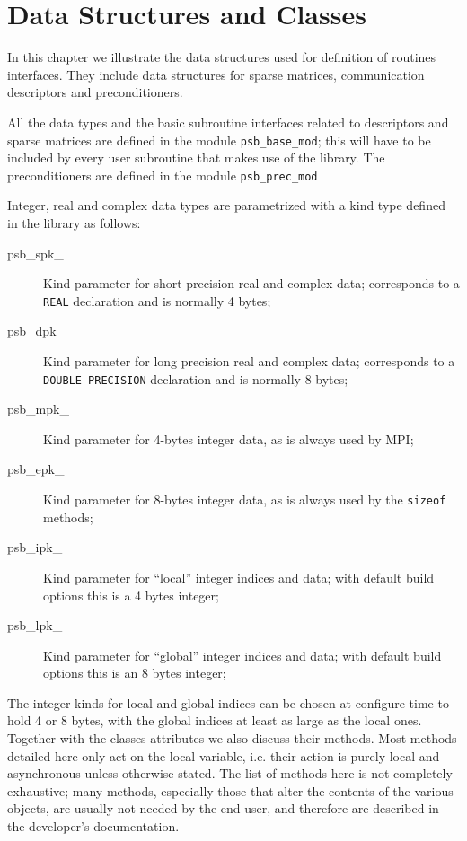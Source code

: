 \section{Data Structures and Classes}
\label{sec:datastruct}

In this chapter we  illustrate the  data structures used for definition of
routines interfaces. They  include data structures for sparse matrices,
communication descriptors and preconditioners.%

All the data types and the basic subroutine interfaces related to
descriptors and sparse matrices are defined in
the module \verb|psb_base_mod|; this will have to be included by every
user subroutine that makes use of the library. The preconditioners are
defined in the module \verb|psb_prec_mod|

Integer, real and complex data types are parametrized with a kind type
defined in the library as follows: 
\begin{description}
\item[psb\_spk\_] Kind parameter for short precision real and complex
  data; corresponds to a \verb|REAL| declaration and is
  normally 4 bytes; 
\item[psb\_dpk\_] Kind parameter for long precision real and complex
  data; corresponds to a \verb|DOUBLE PRECISION| declaration and is
  normally 8 bytes;
\item[psb\_mpk\_] Kind parameter for 4-bytes integer data, as is
  always used by MPI; 
\item[psb\_epk\_] Kind parameter for 8-bytes integer data, as is
  always used by the \verb|sizeof| methods;
\item[psb\_ipk\_] Kind parameter for ``local'' integer indices and data;
  with default build options this is a 4 bytes integer;
\item[psb\_lpk\_] Kind parameter for ``global'' integer indices and data;
  with default build options this is an 8 bytes integer;
\end{description}
The integer kinds for local and global indices can be chosen at
configure time to hold 4 or 8 bytes, with the global indices at least
as large as the local ones. 
Together with the classes attributes we also discuss their
methods.  Most methods detailed here only act on the local variable,
i.e. their action is purely local and asynchronous unless otherwise
stated. 
The list of methods here is not completely exhaustive; many methods,
especially those that alter the contents of the various objects, are
usually not needed by the end-user, and therefore are described in the
developer's documentation. 


